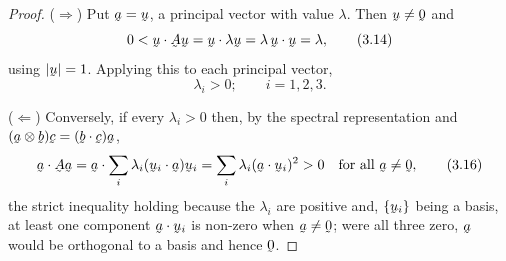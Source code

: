 \begin{proof}
($\Rightarrow$) Put $\ba=\bu$, a principal vector with value $\lambda$.
Then $\bu\neq\bze$ and
\begin{equation}
   0<\ip{\bu}{\bA\bu}=\ip{\bu}{\lambda\bu}=\lambda\,\ip\bu\bu=\lambda ,
   \tag{3.14}\label{eq:3.14}
\end{equation}
using $|\bu|=1$. Applying this to each principal vector,
\begin{equation}
   \lambda_{i}>0;\qquad i=1,2,3 .
   \tag{3.15}\label{eq:3.15}
\end{equation}

($\Leftarrow$) Conversely, if every $\lambda_{i}>0$ then, by the spectral
representation and $(\ba\otimes\bb)\bc=(\ip\bb\bc)\ba$,
\begin{equation}
   \ip{\ba}{\bA\ba}
   =\ip{\ba}{\sum_{i}\lambda_{i}(\ip{\bu_{i}}{\ba})\bu_{i}}
   =\sum_{i}\lambda_{i}(\ip{\ba}{\bu_{i}})^{2}>0
   \quad\text{for all }\ba\neq\bze ,
   \tag{3.16}\label{eq:3.16}
\end{equation}
the strict inequality holding because the $\lambda_{i}$ are positive and,
$\{\bu_{i}\}$ being a basis, at least one component $\ip{\ba}{\bu_{i}}$ is
non-zero when $\ba\neq\bze$; were all three zero, $\ba$ would be
orthogonal to a basis and hence $\bze$.


\end{proof}
